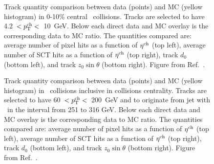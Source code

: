\begin{figure}
\caption{Track quantity comparison between data (points) and MC (yellow histogram) in 0-10\% central \pbpb\ collisions.
Tracks are selected to have 4.2~$<\mbox{$p_{\mathrm{T}}^{\mathrm{ch}}$}<$~10~GeV.
Below each direct data and MC overlay is the corresponding data to MC ratio.
The quantities compared are: average number of pixel hits as a function of $\mbox{$\eta^{\mathrm{ch}}$}$ (top left), average number of SCT hits as a function of $\mbox{$\eta^{\mathrm{ch}}$}$ (top right), track $d_0$ (bottom left), and track $z_0 \sin\theta$ (bottom right).
Figure from Ref.~\cite{Sickles:2235420}.}
\label{fig:trkdataMCcomp_pbpb}
\end{figure}

\begin{figure}
\caption{Track quantity comparison between data (points) and MC (yellow histogram) in \pbpb\ collisions inclusive in collisions centrality.
Tracks are selected to have 60~$<\mbox{$p_{\mathrm{T}}^{\mathrm{ch}}$}<$~200~GeV and to originate from jet with \pt\ in the interval from 251 to 316 GeV.
Below each direct data and MC overlay is the corresponding data to MC ratio.
The quantities compared are: average number of pixel hits as a function of $\mbox{$\eta^{\mathrm{ch}}$}$ (top left), average number of SCT hits as a function of $\mbox{$\eta^{\mathrm{ch}}$}$ (top right), track $d_0$ (bottom left), and track $z_0 \sin\theta$ (bottom right).
Figure from Ref.~\cite{Sickles:2235420}.}
\label{fig:trkdataMCcomp_pbpb_highpt}
\end{figure}


